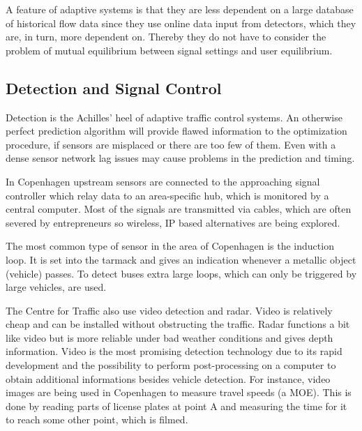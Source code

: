 A feature of adaptive systems is that they are less dependent on a large database of historical flow data since they use online data input from detectors, which they are, in turn, more dependent on. Thereby they do not have to consider the problem of mutual equilibrium between signal settings and user equilibrium.

\subsection{Detection and Signal Control}
Detection is the Achilles' heel of adaptive traffic control systems. An otherwise perfect prediction algorithm will provide flawed information to the optimization procedure, if sensors are misplaced or there are too few of them. Even with a dense sensor network lag issues may cause problems in the prediction and timing.

In Copenhagen upstream sensors are connected to the approaching signal controller which relay data to an area-specific hub, which is monitored by a central computer. Most of the signals are transmitted via cables, which are often severed by entrepreneurs so wireless, IP based alternatives are being explored.

The most common type of sensor in the area of Copenhagen is the induction loop. It is set into the tarmack and gives an indication whenever a metallic object (vehicle) passes. To detect buses extra large loops, which can only be triggered by large vehicles, are used. 

The Centre for Traffic also use video detection and radar. Video is relatively cheap and can be installed without obstructing the traffic. Radar functions a bit like video but is more reliable under bad weather conditions and gives depth information.
Video is the most promising detection technology due to its rapid development and the possibility to perform post-processing on a computer to obtain additional informations besides vehicle detection. For instance, video images are being used in Copenhagen to measure travel speeds (a MOE). This is done by reading parts of license plates at point A and measuring the time for it to reach some other point, which is filmed.